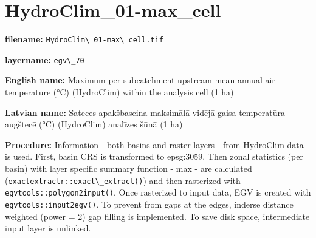 \documentclass[
]{book}
\newcommand{\passthrough}[1]{#1}
\begin{document}
\section{HydroClim\_01-max\_cell}\label{ch06.070}

\textbf{filename:} \passthrough{\lstinline!HydroClim\_01-max\_cell.tif!}

\textbf{layername:} \passthrough{\lstinline!egv\_70!}

\textbf{English name:} Maximum per subcatchment upstream mean annual air temperature (°C) (HydroClim) within the analysis cell (1 ha)

\textbf{Latvian name:} Sateces apakšbaseina maksimālā vidējā gaisa temperatūra augštecē (°C) (HydroClim) analīzes šūnā (1 ha)

\textbf{Procedure:} Information - both basins and raster layers - from \hyperref[Ch04.12]{HydroClim data}
is used. First, basin CRS is transformed to epsg:3059. Then zonal statistics (per basin) with
layer specific summary function - max - are calculated (\passthrough{\lstinline!exactextractr::exact\_extract()!})
and then rasterized with \passthrough{\lstinline!egvtools::polygon2input()!}. Once rasterized to input data,
EGV is created with \passthrough{\lstinline!egvtools::input2egv()!}. To prevent from gaps at the edges,
inderse distance weighted (power = 2) gap filling is implemented. To save disk space,
intermediate input layer is unlinked.
\end{document}
